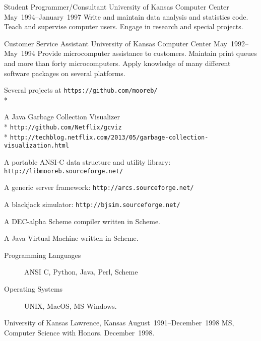 \documentclass{resume}
\begin{document}
\begin{resume}
\begin{Employment}
\begin{job}{Student Programmer/Consultant}
           {University of Kansas Computer Center}
           {May~1994--January~1997}
  Write and maintain data analysis and statistics code.
  Teach and supervise computer users.
  Engage in research and special projects.
\end{job}

\begin{job}{Customer Service Assistant}
           {University of Kansas Computer Center}
           {May~1992--May~1994}
  Provide microcomputer assistance to customers.
  Maintain print queues and more than forty microcomputers.
  Apply knowledge of many different software packages on several platforms. 
\end{job}
\end{Employment}

\begin{Projects}
  Several projects at {\tt https://github.com/mooreb/} \\*

  A Java Garbage Collection Visualizer \\*
    {\tt http://github.com/Netflix/gcviz } \\*
    {\tt http://techblog.netflix.com/2013/05/garbage-collection-visualization.html }

  A portable ANSI-C data structure and utility library: {\tt http://libmooreb.sourceforge.net/ }

  A generic server framework: {\tt http://arcs.sourceforge.net/ }

  A blackjack simulator: {\tt http://bjsim.sourceforge.net/ }

  A DEC-alpha Scheme compiler written in Scheme.

  A Java Virtual Machine written in Scheme.
\end{Projects}

\begin{Skills}
\begin{description}
\item[Programming Languages]  ANSI C, Python, Java, Perl, Scheme
\item[Operating Systems] UNIX, MacOS, MS Windows.
\end{description}
\end{Skills}

\begin{Education}
\begin{job}{University of Kansas}
           {Lawrence, Kansas}
           {August~1991--December~1998}
  MS, Computer Science with Honors. December~1998.


\end{job}
\end{Education}
\end{resume}
\end{document}
